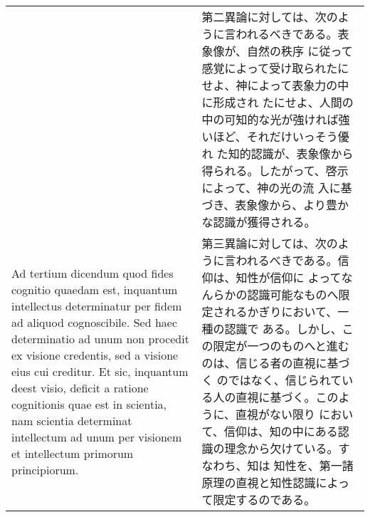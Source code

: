 \documentclass[10pt]{jsarticle} %
\begin{document}
\begin{longtable}{p{21em}p{21em}}
&

第二異論に対しては、次のように言われるべきである。表象像が、自然の秩序
に従って感覚によって受け取られたにせよ、神によって表象力の中に形成され
たにせよ、人間の中の可知的な光が強ければ強いほど、それだけいっそう優れ
た知的認識が、表象像から得られる。したがって、啓示によって、神の光の流
入に基づき、表象像から、より豊かな認識が獲得される。

\\

{\sc Ad tertium dicendum} quod fides cognitio quaedam est,
 inquantum intellectus determinatur per fidem ad aliquod
 cognoscibile. Sed haec determinatio ad unum non procedit ex visione
 credentis, sed a visione eius cui creditur. Et sic, inquantum deest
 visio, deficit a ratione cognitionis quae est in scientia, nam scientia
 determinat intellectum ad unum per visionem et intellectum primorum
 principiorum.

&

第三異論に対しては、次のように言われるべきである。信仰は、知性が信仰に
よってなんらかの認識可能なものへ限定されるかぎりにおいて、一種の認識で
ある。しかし、この限定が一つのものへと進むのは、信じる者の直視に基づく
のではなく、信じられている人の直視に基づく。このように、直視がない限り
において、信仰は、知の中にある認識の理念から欠けている。すなわち、知は
知性を、第一諸原理の直視と知性認識によって限定するのである。



\end{longtable}
\end{document}
